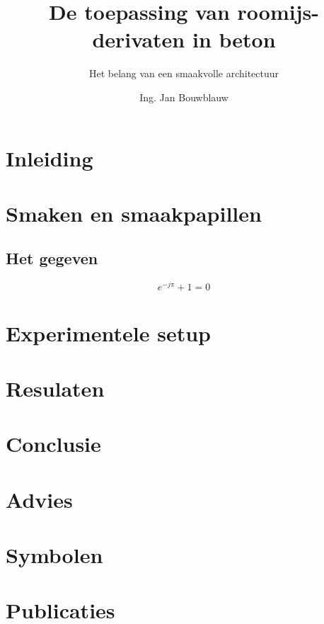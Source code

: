 \documentclass[10pt,twoside,openright,filled]{uantwerpenreport}
\title{De toepassing van roomijs-derivaten in beton}
\subtitle{Het belang van een smaakvolle architectuur}
\author{Ing. Jan Bouwblauw}
\affiliation{Universiteit Antwerpen | Building Research Group}
\begin{document}
\maketitle

\frontmatter

\tableofcontents

\mainmatter
\chapter*{Inleiding}

\kant[1]

\chapter{Smaken en smaakpapillen}

\section{Het gegeven}

\kant[2]

\begin{equation}
  e^{-j\pi} + 1 = 0
\end{equation}

\kant[3-17]

\chapter{Experimentele setup}

\kant[18-19]

\chapter{Resulaten}

\kant[20-21]

\chapter{Conclusie}

\kant[22-24]

\chapter{Advies}

\kant[25]

\appendix
\chapter{Symbolen}

\chapter{Publicaties}

\makefinalpage
\end{document}
